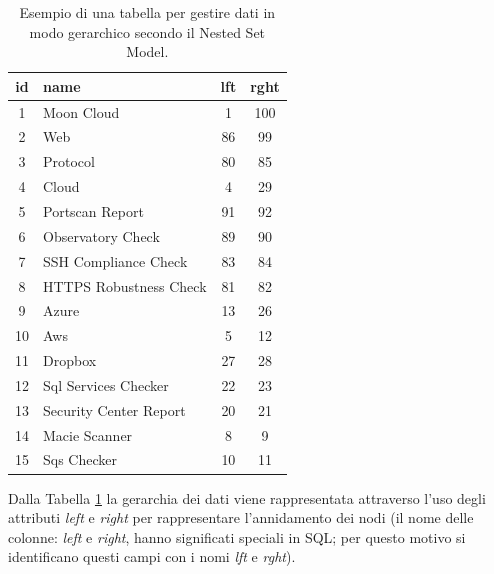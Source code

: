 \begin{table}[ht!]
\centering
\begin{tabular}[c]{| c | l | c | c |}
    \hline
    id & name & lft & rght \\ [0.5ex] 
    \hline
    \rowcolor{rootnodecell} 1 & Moon Cloud & 1 & 100 \\ [0.5ex] 
    \rowcolor{categorycell} 2 & Web & 86 & 99 \\ [0.5ex] 
    \rowcolor{categorycell} 3 & Protocol & 80 & 85 \\ [0.5ex] 
    \rowcolor{categorycell} 4 & Cloud & 4 & 29 \\ [0.5ex] 
    \rowcolor{evaluationcell} 5 & Portscan Report & 91 & 92 \\ [0.5ex] 
    \rowcolor{evaluationcell} 6 & Observatory Check & 89 & 90 \\ [0.5ex] 
    \rowcolor{evaluationcell} 7 & SSH Compliance Check & 83 & 84 \\ [0.5ex] 
    \rowcolor{evaluationcell} 8 & HTTPS Robustness Check & 81 & 82 \\ [0.5ex] 
    \rowcolor{categorycell} 9 & Azure & 13 & 26 \\ [0.5ex] 
    \rowcolor{categorycell} 10 & Aws & 5 & 12 \\ [0.5ex] 
    \rowcolor{categorycell} 11 & Dropbox & 27 & 28 \\ [0.5ex] 
    \rowcolor{evaluationcell} 12 & Sql Services Checker & 22 & 23 \\ [0.5ex] 
    \rowcolor{evaluationcell} 13 & Security Center Report & 20 & 21 \\ [0.5ex] 
    \rowcolor{evaluationcell} 14 & Macie Scanner & 8 & 9 \\ [0.5ex] 
    \rowcolor{evaluationcell} 15 & Sqs Checker & 10 & 11 \\ [0.5ex]
    \hline
\end{tabular}
\caption{Esempio di una tabella per gestire dati in modo gerarchico secondo il Nested Set Model.}
\label{table:nested_set_model_table}
\end{table}
\hfill\break
Dalla Tabella \ref{table:nested_set_model_table} la gerarchia dei dati viene rappresentata attraverso l'uso 
degli attributi \textit{left} e \textit{right} per rappresentare l'annidamento dei nodi (il nome delle colonne: \textit{left} e \textit{right}, hanno significati 
speciali in SQL; per questo motivo si identificano questi campi con i nomi \textit{lft} e \textit{rght}).
%
